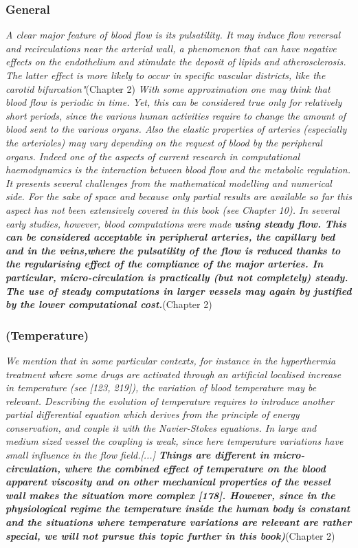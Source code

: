 \documentclass[11pt,letterpaper]{article}
\begin{document}
\subsubsection*{General} \textit{A clear major feature of blood flow is its pulsatility. It may induce flow
reversal and recirculations near the arterial wall, a phenomenon that can have negative effects on the endothelium and stimulate the deposit of lipids and atherosclerosis. The latter effect is more likely to occur in specific vascular districts, like the carotid bifurcation"}(Chapter 2) \newline\newline \textit{With some approximation one may think that blood flow is periodic in time. Yet, this can be considered true only for relatively short periods, since the various human activities require to change the amount of blood sent to the various organs. Also the elastic properties of arteries (especially the arterioles) may vary depending on the request of blood by the peripheral organs. Indeed one of the aspects of current research in computational haemodynamics is the interaction between blood flow and the metabolic regulation. It presents several challenges from the mathematical modelling and numerical side. For the sake of space and because only partial results are available so far this aspect has not been extensively covered in this book (see Chapter 10). In several early studies, however, blood computations were made \textbf{using
steady flow. This can be considered acceptable in peripheral arteries, the capillary bed and in the veins,where the pulsatility of the flow is reduced thanks to the regularising effect of the compliance of the major arteries. In particular, micro-circulation is practically (but not completely) steady. The use of steady computations in larger vessels may again by justified by the lower computational cost.}}(Chapter 2)

\subsubsection*{(Temperature)} \textit{We mention that in some particular contexts, for instance in the hyperthermia treatment where some drugs are activated through an artificial localised increase in temperature (see [123, 219]), the variation of blood temperature may be relevant. Describing the evolution of temperature requires to introduce another partial differential equation which derives from the principle of energy conservation, and couple it with the Navier-Stokes equations. In large and medium sized vessel the coupling is weak, since here temperature variations have small influence in the flow field.[...] \textbf{Things are different in micro-circulation, where the combined effect of temperature on the blood apparent viscosity and on other mechanical properties of the vessel wall makes the situation more complex [178]. However, since in the physiological regime the temperature inside the human body is constant and the situations where temperature variations are relevant are rather special, we will not pursue this topic further in this book}\textbf{)}}(Chapter 2)
\end{document}
